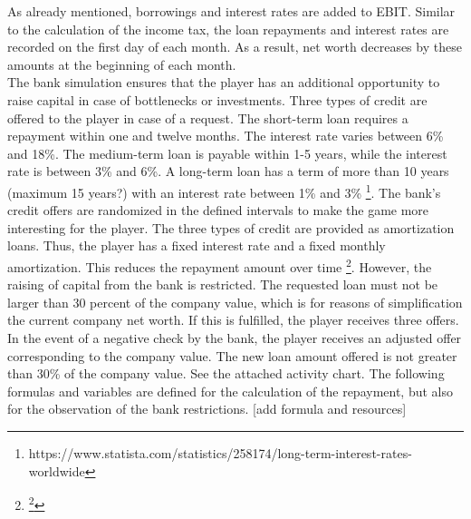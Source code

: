 As already mentioned, borrowings and interest rates are added to EBIT. Similar to the calculation of the income tax, the loan repayments and interest rates are recorded on the first day of each month. As a result, net worth decreases by these amounts at the beginning of each month.\\
The bank simulation ensures that the player has an additional opportunity to raise capital in case of bottlenecks or investments. Three types of credit are offered to the player in case of a request. 
The short-term loan requires a repayment within one and twelve months. The interest rate varies between 6\% and 18\%. The medium-term loan is payable within 1-5 years, while the interest rate is between 3\% and 6\%. A long-term loan has a term of more than 10 years (maximum 15 years?) with an interest rate between 1\% and 3\% \footnote{https://www.statista.com/statistics/258174/long-term-interest-rates-worldwide}. The bank's credit offers are randomized in the defined intervals to make the game more interesting for the player. The three types of credit are provided as amortization loans. Thus, the player has a fixed interest rate and a fixed monthly amortization. This reduces the repayment amount over time \footnote{\footnote{https://www.investopedia.com/terms/a/amortized\_loan.asp}}.
However, the raising of capital from the bank is restricted.
The requested loan must not be larger than 30 percent of the company value, which is for reasons of simplification the current company net worth. If this is fulfilled, the player receives three offers. In the event of a negative check by the bank, the player receives an adjusted offer corresponding to the company value. The new loan amount offered is not greater than 30\% of the company value. See the attached activity chart. 
The following formulas and variables are defined for the calculation of the repayment, but also for the observation of the bank restrictions. [add formula and resources]\\

